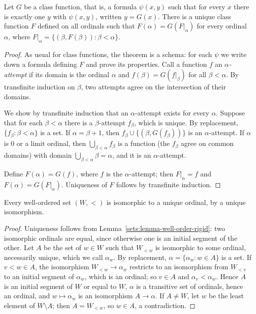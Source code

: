 \begin{theorem}\label{sets:theorem-transfinite-recursion}
Let $G$ be a class function, that is, a formula $\psi(x, y)$ such that for
every $x$ there is exactly one $y$ with $\psi(x, y)$, written $y = G(x)$. There
is a unique class function $F$ defined on all ordinals such that
$F(\alpha) = G(F|_\alpha)$ for every ordinal $\alpha$, where
$F|_\alpha = \{(\beta, F(\beta)) : \beta < \alpha\}$.
\end{theorem}

\begin{proof}
As usual for class functions, the theorem is a schema: for each $\psi$ we
write down a formula defining $F$ and prove its properties. Call a function
$f$ an \emph{$\alpha$-attempt} if its domain is the ordinal $\alpha$ and
$f(\beta) = G(f|_\beta)$ for all $\beta < \alpha$. By transfinite induction on
$\beta$, two attempts agree on the intersection of their domains.

We show by transfinite induction that an $\alpha$-attempt exists for every
$\alpha$. Suppose that for each $\beta < \alpha$ there is a $\beta$-attempt
$f_\beta$, which is unique. By replacement, $\{f_\beta : \beta < \alpha\}$ is a
set. If $\alpha = \beta + 1$, then $f_\beta \cup \{(\beta, G(f_\beta))\}$ is an
$\alpha$-attempt. If $\alpha$ is $0$ or a limit ordinal, then
$\bigcup_{\beta < \alpha} f_\beta$ is a function (the $f_\beta$ agree on common
domains) with domain $\bigcup_{\beta < \alpha} \beta = \alpha$, and it is an
$\alpha$-attempt.

Define $F(\alpha) = G(f)$, where $f$ is the $\alpha$-attempt; then
$F|_\alpha = f$ and $F(\alpha) = G(F|_\alpha)$. Uniqueness of $F$ follows by
transfinite induction.
\end{proof}

\begin{theorem}\label{sets:theorem-order-type}
Every well-ordered set $(W, <)$ is isomorphic to a unique ordinal, by a unique
isomorphism.
\end{theorem}

\begin{proof}
Uniqueness follows from Lemma~\ref{sets:lemma-well-order-rigid}: two
isomorphic ordinals are equal, since otherwise one is an initial segment of
the other. Let $A$ be the set of $w \in W$ such that $W_{<w}$ is isomorphic to
some ordinal, necessarily unique, which we call $\alpha_w$. By replacement,
$\alpha = \{\alpha_w : w \in A\}$ is a set. If $v < w \in A$, the isomorphism
$W_{<w} \to \alpha_w$ restricts to an isomorphism from $W_{<v}$ to an initial
segment of $\alpha_w$, which is an ordinal; so $v \in A$ and $\alpha_v < \alpha_w$.
Hence $A$ is an initial segment of $W$ or equal to $W$, $\alpha$ is a
transitive set of ordinals, hence an ordinal, and $w \mapsto \alpha_w$ is an
isomorphism $A \to \alpha$. If $A \neq W$, let $w$ be the least element of
$W \setminus A$; then $A = W_{<w}$, so $w \in A$, a contradiction.
\end{proof}

